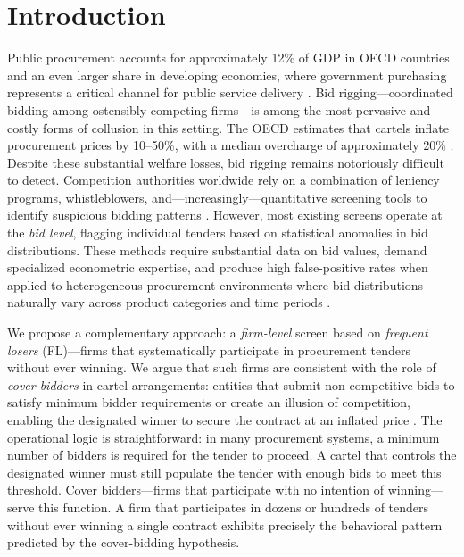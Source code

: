\section{Introduction}
\label{sec:intro}

Public procurement accounts for approximately 12\% of GDP in OECD countries and an even larger share in developing economies, where government purchasing represents a critical channel for public service delivery \citep{hovenkamp2005federal}. Bid rigging---coordinated bidding among ostensibly competing firms---is among the most pervasive and costly forms of collusion in this setting. The OECD estimates that cartels inflate procurement prices by 10--50\%, with a median overcharge of approximately 20\% \citep{connor2007price}. Despite these substantial welfare losses, bid rigging remains notoriously difficult to detect. Competition authorities worldwide rely on a combination of leniency programs, whistleblowers, and---increasingly---quantitative screening tools to identify suspicious bidding patterns \citep{harrington2008detecting, imhof2019detecting}. However, most existing screens operate at the \textit{bid level}, flagging individual tenders based on statistical anomalies in bid distributions. These methods require substantial data on bid values, demand specialized econometric expertise, and produce high false-positive rates when applied to heterogeneous procurement environments where bid distributions naturally vary across product categories and time periods \citep{sanchezgraells2019screening}.

We propose a complementary approach: a \textit{firm-level} screen based on \textit{frequent losers} (FL)---firms that systematically participate in procurement tenders without ever winning. We argue that such firms are consistent with the role of \textit{cover bidders} in cartel arrangements: entities that submit non-competitive bids to satisfy minimum bidder requirements or create an illusion of competition, enabling the designated winner to secure the contract at an inflated price \citep{porter1993detection, marshall2012economics}. The operational logic is straightforward: in many procurement systems, a minimum number of bidders is required for the tender to proceed. A cartel that controls the designated winner must still populate the tender with enough bids to meet this threshold. Cover bidders---firms that participate with no intention of winning---serve this function. A firm that participates in dozens or hundreds of tenders without ever winning a single contract exhibits precisely the behavioral pattern predicted by the cover-bidding hypothesis.

